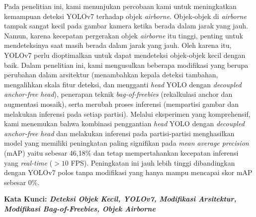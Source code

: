 Pada penelitian ini, kami menunjukan percobaan kami untuk meningkatkan kemampuan deteksi YOLOv7 terhadap objek \emph{airborne}. 
Objek-objek di \emph{airborne} tampak sangat kecil pada gambar kamera ketika berada dalam jarak yang jauh. Namun, karena kecepatan pergerakan objek \emph{airborne} itu tinggi, penting untuk mendeteksinya saat masih berada dalam jarak yang jauh. 
Oleh karena itu, YOLOv7 perlu dioptimalkan untuk dapat mendeteksi objek-objek kecil dengan baik. 
Dalam penelitian ini, kami mengusulkan beberapa modifikasi yang berupa perubahan dalam arsitektur (menambahkan kepala deteksi tambahan, mengalihkan skala fitur deteksi, dan mengganti \emph{head} YOLO dengan \emph{decoupled anchor-free head}), penerapan teknik \emph{bag-of-freebies} (rekalkulasi anchor dan augmentasi mosaik), serta merubah proses inferensi (mempartisi gambar dan melakukan inferensi pada setiap partisi). 
Melalui eksperimen yang komprehensif, kami menemukan bahwa kombinasi penggantian \emph{head} YOLO dengan \emph{decoupled anchor-free head} dan melakukan inferensi pada partisi-partisi menghasilkan model yang memiliki peningkatan paling signifikan pada \emph{mean average precision} (mAP) yaitu sebesar 46,18\% dan tetap mempertahankan kecepatan inferensi yang \emph{real-time} ($>10$ FPS). 
Peningkatan ini jauh lebih tinggi dibandingkan dengan YOLOv7 polos tanpa modifikasi yang hanya mampu mencapai skor mAP sebesar 0\%.

\noindent
\textbf{Kata Kunci: \emph{Deteksi Objek Kecil, YOLOv7, Modifikasi Arsitektur, Modifikasi Bag-of-Freebies, Objek Airborne}}
